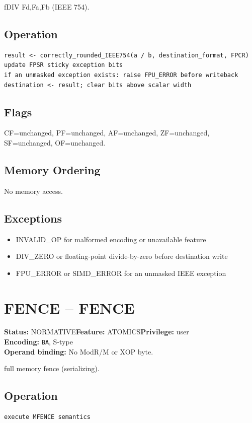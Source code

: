 \documentclass[10pt]{article}
\begin{document}
fDIV Fd,Fa,Fb (IEEE 754).

\subsection*{Operation}
\begin{lstlisting}
result <- correctly_rounded_IEEE754(a / b, destination_format, FPCR)
update FPSR sticky exception bits
if an unmasked exception exists: raise FPU_ERROR before writeback
destination <- result; clear bits above scalar width
\end{lstlisting}
\subsection*{Flags}
CF=unchanged, PF=unchanged, AF=unchanged, ZF=unchanged, SF=unchanged, OF=unchanged.
\subsection*{Memory Ordering}
No memory access.
\subsection*{Exceptions}
\begin{itemize}
\item INVALID\_OP for malformed encoding or unavailable feature
\item DIV\_ZERO or floating-point divide-by-zero before destination write
\item FPU\_ERROR or SIMD\_ERROR for an unmasked IEEE exception
\end{itemize}
\clearpage

\section{FENCE -- FENCE}
\textbf{Status:} NORMATIVE\quad \textbf{Feature:} ATOMICS\quad \textbf{Privilege:} user\\
\textbf{Encoding:} \texttt{BA}, S-type\\
\textbf{Operand binding:} No ModR/M or XOP byte.

full memory fence (serializing).

\subsection*{Operation}
\begin{lstlisting}
execute MFENCE semantics
\end{lstlisting}
\end{document}
